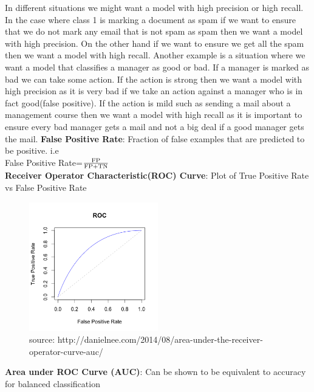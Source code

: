 In different situations we might want a model with high precision or high recall. In the case where class 1 is marking a document as spam if we want to ensure that we do not mark any email that is not spam as spam then we want a model with high precision. On the other hand if we want to ensure we get all the spam then we want a model with high recall. Another example is a situation where we want a model that classifies a manager as good or bad. If a manager is marked as bad we can take some action. If the action is strong then we want a model with high precision as it is very bad if we take an action against a manager who is in fact good(false positive). If the action is mild such as sending a mail about a management course then we want a model with high recall as it is important to ensure every bad manager gets a mail and not a big deal if a good manager gets the mail.
%
\textbf{False Positive Rate}: Fraction of false examples that are predicted to be positive. i.e\\
False Positive Rate=$\frac{\textnormal{FP}}{\textnormal{FP+TN}}$ \\


\textbf{Receiver Operator Characteristic(ROC) Curve}: Plot of True Positive Rate vs False Positive Rate
   \begin{figure}[ht]
   	\begin{center}
   		\includegraphics[width=0.5\textwidth]{figures/ROC.png}
   		\caption{source: http://danielnee.com/2014/08/area-under-the-receiver-operator-curve-auc/}
   		\label{fig:example_figure}
   	\end{center}
   \end{figure}
   
   

\textbf{Area under ROC Curve (AUC)}: Can be shown to be equivalent to accuracy for balanced classification



